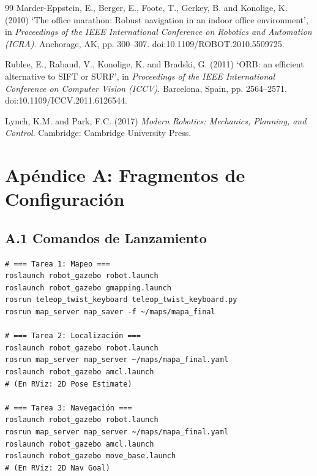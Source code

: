\documentclass[12pt,letterpaper]{article}
\begin{document}
\begin{thebibliography}{99}
Marder-Eppstein, E., Berger, E., Foote, T., Gerkey, B. and Konolige, K. (2010) `The office marathon: Robust navigation in an indoor office environment', in \textit{Proceedings of the IEEE International Conference on Robotics and Automation (ICRA)}. Anchorage, AK, pp. 300--307. doi:10.1109/ROBOT.2010.5509725.

Rublee, E., Rabaud, V., Konolige, K. and Bradski, G. (2011) `ORB: an efficient alternative to SIFT or SURF', in \textit{Proceedings of the IEEE International Conference on Computer Vision (ICCV)}. Barcelona, Spain, pp. 2564--2571. doi:10.1109/ICCV.2011.6126544.

Lynch, K.M. and Park, F.C. (2017) \textit{Modern Robotics: Mechanics, Planning, and Control}. Cambridge: Cambridge University Press.

\end{thebibliography}

\newpage

\section*{Apéndice A: Fragmentos de Configuración}

\subsection*{A.1 Comandos de Lanzamiento}

\begin{lstlisting}[caption={Pipeline completo de lanzamiento por tarea.}, style=bashstyle]
# === Tarea 1: Mapeo ===
roslaunch robot_gazebo robot.launch
roslaunch robot_gazebo gmapping.launch
rosrun teleop_twist_keyboard teleop_twist_keyboard.py
rosrun map_server map_saver -f ~/maps/mapa_final

# === Tarea 2: Localización ===
roslaunch robot_gazebo robot.launch
rosrun map_server map_server ~/maps/mapa_final.yaml
roslaunch robot_gazebo amcl.launch
# (En RViz: 2D Pose Estimate)

# === Tarea 3: Navegación ===
roslaunch robot_gazebo robot.launch
rosrun map_server map_server ~/maps/mapa_final.yaml
roslaunch robot_gazebo amcl.launch
roslaunch robot_gazebo move_base.launch
# (En RViz: 2D Nav Goal)
\end{lstlisting}
\end{document}
